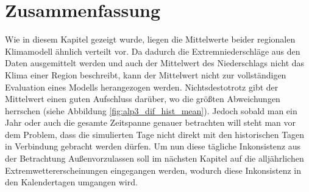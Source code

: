 \begin{comment}
In der Abb. \ref{fig:precip_2002} liegen die im regionalen Klimamodell (ALP-3) die vorhergesagten Niederschlagsmengen für größere Niederschlagsmengen z.B. im Mai 2002 um einiges näher an den beobachteten Daten. Es werden jedoch auch manche Niederschlagsereignisse schlichtweg überschätzt, was sich dann im Gesamtbild schlecht auswirkt (vgl.\ref{fig:freq_2002}: die Kurve ist deutlich ins Positive verschoben.\\
Das Klimamodell welches die Konvektion nicht simuliert (EUR-11) scheint dauernd eine gewisse Fluktuation im Niederschlag zu errechnen, ohne gezielt Starkregenereignisse zu reproduzieren. Dies ist gut im Bereich April 2002 in der Abb. \ref{fig:precip_2002} zu erkennen: Die Fluktuationen scheinen gewissermaßen ständig aufzutreten. Das ist auf die Parametrisierung der Konvektion zurückzuführen. Da dadurch auch keine längeren Regenpausen vorkommen können, ist dies ein großes Manko in der Vorhersagekraft von diesen Modellen für die zukünftige Entwicklung des Klimas auf regionaler Ebene (siehe ''Bias Correction, Quantile Mapping, and Downscaling: Revisiting the Inflation Issue'' von D.Maraun \cite{biasMaraun}). \\
Das Konvektion-simulierende Klimamodell ALP-3 scheint besonders im Winter und im Herbst Niederschlagsextrema zu überschätzen. Im Sommer  bzw. Frühling stimmen die Daten relativ gut überein. Manche Extrema sind zwar zeitlich verschoben, jedoch muss bemerkt werden, dass die historischen Tage nichts mit den simulierten Tage im Klimamodell gemein haben, somit darf die zeitliche Verteilung nicht zu genau genommen werden. Sondern es muss eine gewisse Toleranz, wann ein Starkregenereignis eintritt mit-einberechnet werden.\\
\end{comment}
\section{Zusammenfassung}\label{sec:zusammenfassung_01}
Wie in diesem Kapitel gezeigt wurde, liegen die Mittelwerte beider regionalen Klimamodell ähnlich verteilt vor. Da dadurch die Extremniederschläge aus den Daten ausgemittelt werden und auch der Mittelwert des Niederschlags nicht das Klima einer Region beschreibt, kann der Mittelwert nicht zur vollständigen Evaluation eines Modells herangezogen werden. Nichtsdestotrotz gibt der Mittelwert einen guten Aufschluss darüber, wo die größten Abweichungen herrschen (siehe Abbildung \ref{fig:alp3_dif_hist_mean}). Jedoch sobald man ein Jahr oder auch die gesamte Zeitspanne genauer betrachten will steht man vor dem Problem, dass die simulierten Tage nicht direkt mit den historischen Tagen in Verbindung gebracht werden dürfen. Um nun diese tägliche Inkonsistenz aus der Betrachtung Außenvorzulassen soll im nächsten Kapitel auf die alljährlichen Extremwettererscheinungen eingegangen werden, wodurch diese Inkonsistenz in den Kalendertagen umgangen wird.